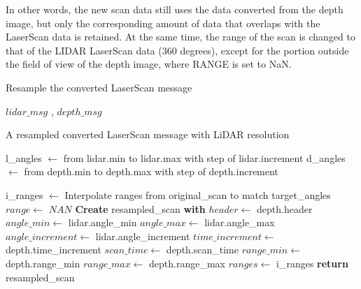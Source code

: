 In other words, the new scan data still uses the data converted from the depth image, but only the corresponding amount of data that overlaps with the LaserScan data is retained. At the same time, the range of the scan is changed to that of the LIDAR LaserScan data (360 degrees), except for the portion outside the field of view of the depth image, where RANGE is set to NaN.

\begin{algorithm}[H]
    \caption{Resample the converted LaserScan message}\label{alg:resample}
    \begin{algorithmic}
        \Require $lidar\_msg$ , $depth\_msg$ 
    
        \Ensure A resampled converted LaserScan message with LiDAR resolution

        \State l\_angles $\gets$ from lidar.min to lidar.max with step of lidar.increment
        \State d\_angles $\gets$ from depth.min to depth.max with step of depth.increment

        \State i\_ranges $\gets$ Interpolate ranges from original\_scan to match target\_angles
            \State $range \gets$ $NAN$
        \EndIf
        \State \textbf{Create} resampled\_scan \textbf{with}
            \State $header \gets$ depth.header
            \State $angle\_min \gets$ lidar.angle\_min
            \State $angle\_max \gets$ lidar.angle\_max
            \State $angle\_increment \gets$ lidar.angle\_increment
            \State $time\_increment \gets$ depth.time\_increment
            \State $scan\_time \gets$ depth.scan\_time
            \State $range\_min \gets$ depth.range\_min
            \State $range\_max \gets$ depth.range\_max
            \State $ranges \gets$ i\_ranges
        \State \textbf{return} resampled\_scan
    \end{algorithmic}
\end{algorithm}